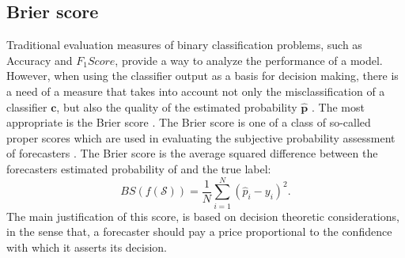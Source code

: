 \subsection{Brier score}
\label{sec:2:brier}

Traditional evaluation measures of binary classification problems, such as Accuracy and 
$F_1Score$, provide a way to analyze the performance of a model. However, when using the classifier 
output as a basis for decision making, there is a need of a measure that takes into account not 
only the misclassification of a classifier $\mathbf{c}$, but also the quality of the estimated 
probability $\mathbf{\hat p}$ \citep{cohen2004}. The most appropriate  is the Brier score 
\citep{brier1950}. The Brier score is one of a class of so-called proper scores which are used in 
evaluating the subjective probability assessment of forecasters \citep{DeGroot1983}. The Brier 
score is the average squared difference between the forecasters estimated probability of and the 
true label:
\begin{equation}
  BS(f(\mathcal{S})) = \frac{1}{N} \sum_{i=1}^{N} (\hat p_i - y_i)^2.
\end{equation}
The main justification of this score, is based on decision theoretic considerations, in the sense 
that, a forecaster should pay a price proportional to the confidence with which it asserts its 
decision.

